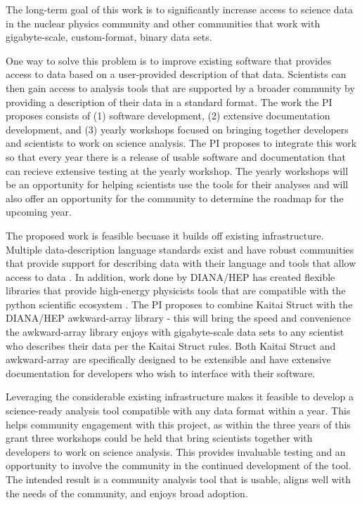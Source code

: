 The long-term goal of this work is to significantly increase access to science data in the nuclear physics community and other communities that work with gigabyte-scale, custom-format, binary data sets.  

One way to solve this problem is to improve existing software that provides access to data based on a user-provided description of that data.  Scientists can then gain access to analysis tools that are supported by a broader community by providing a description of their data in a standard format.  The work the PI proposes consists of (1) software development, (2) extensive documentation development, and (3) yearly workshops focused on bringing together developers and scientists to work on science analysis.  The PI proposes to integrate this work so that every year there is a release of usable software and documentation that can recieve extensive testing at the yearly workshop.  The yearly workshops will be an opportunity for helping scientists use the tools for their analyses and will also offer an opportunity for the community to determine the roadmap for the upcoming year.

The proposed work is feasible becuase it builds off existing infrastructure.  Multiple data-description language standards exist and have robust communities that provide support for describing data with their language and tools that allow access to data \cite{kaitai, kaitai-spec, dfdl, dfdl-spec}.  In addition, work done by DIANA/HEP has created flexible libraries that provide high-energy physicists tools that are compatible with the python scientific ecosystem \cite{diana-hep, iris-hep}.  The PI proposes to combine Kaitai Struct with the DIANA/HEP awkward-array library - this will bring the speed and convenience the awkward-array library enjoys with gigabyte-scale data sets to any scientist who describes their data per the Kaitai Struct rules.  Both Kaitai Struct and awkward-array are specifically designed to be extensible and have extensive documentation for developers who wish to interface with their software.  

Leveraging the considerable existing infrastructure makes it feasible to develop a science-ready analysis tool compatible with any data format within a year.  This helps community engagement with this project, as within the three years of this grant three workshops could be held that bring scientists together with developers to work on science analysis.  This provides invaluable testing and an opportunity to involve the community in the continued development of the tool.  The intended result is a community analysis tool that is usable, aligns well with the needs of the community, and enjoys broad adoption.

